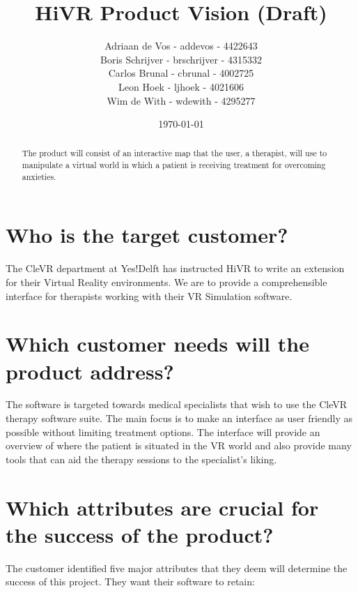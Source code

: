 \documentclass[11pt]{article}
\begin{document}
\title{HiVR Product Vision (Draft)}
\author{
	Adriaan de Vos - addevos - 4422643\\
	Boris Schrijver - brschrijver - 4315332\\
	Carlos Brunal - cbrunal - 4002725\\
	Leon Hoek - ljhoek - 4021606\\
	Wim de With - wdewith - 4295277
}
\date{\today}

\maketitle

\begin{abstract}
   The product will consist of an interactive map that the user, a therapist, will use to manipulate a virtual world in which a patient is receiving treatment for overcoming anxieties.
\end{abstract}

\newpage
\tableofcontents
\newpage



\section{Who is the target customer?}
	The CleVR department at Yes!Delft has instructed HiVR to write an extension for their Virtual Reality environments.
    We are to provide a comprehensible interface for therapists working with their VR Simulation software.
   
\section{Which customer needs will the product address?}
The software is targeted towards medical specialists that wish to use the CleVR therapy software suite. The main focus is to make an interface as user friendly as possible without limiting treatment options. The interface will provide an overview of where the patient is situated in the VR world and also provide many tools that can aid the therapy sessions to the specialist's liking.

\section{Which attributes are crucial for the success of the product?}
	The customer identified five major attributes that they deem will determine the success of this project. They want their software to retain:       
    
\end{document}
